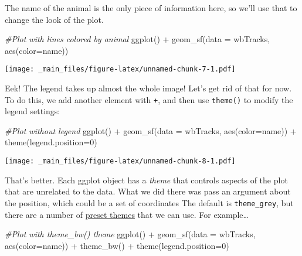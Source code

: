 \documentclass[
]{book}
\newenvironment{Shaded}{\begin{snugshade}}{\end{snugshade}}
\newcommand{\AttributeTok}[1]{\textcolor[rgb]{0.77,0.63,0.00}{#1}}
\newcommand{\CommentTok}[1]{\textcolor[rgb]{0.56,0.35,0.01}{\textit{#1}}}
\newcommand{\DecValTok}[1]{\textcolor[rgb]{0.00,0.00,0.81}{#1}}
\newcommand{\FunctionTok}[1]{\textcolor[rgb]{0.00,0.00,0.00}{#1}}
\newcommand{\NormalTok}[1]{#1}
\newcommand{\SpecialCharTok}[1]{\textcolor[rgb]{0.00,0.00,0.00}{#1}}
\begin{document}
The name of the animal is the only piece of information here, so we'll use that to change the look of the plot.

\begin{Shaded}
\begin{Highlighting}[]
\CommentTok{\#Plot with lines colored by animal}
\FunctionTok{ggplot}\NormalTok{() }\SpecialCharTok{+} 
  \FunctionTok{geom\_sf}\NormalTok{(}\AttributeTok{data =}\NormalTok{ wbTracks, }\FunctionTok{aes}\NormalTok{(}\AttributeTok{color=}\NormalTok{name))}
\end{Highlighting}
\end{Shaded}

\texttt{[image: \_main\_files/figure-latex/unnamed-chunk-7-1.pdf]}

Eek! The legend takes up almost the whole image! Let's get rid of that for now. To do this, we add another element with \texttt{+}, and then use \texttt{theme()} to modify the legend settings:

\begin{Shaded}
\begin{Highlighting}[]
\CommentTok{\#Plot without legend}
\FunctionTok{ggplot}\NormalTok{() }\SpecialCharTok{+} 
  \FunctionTok{geom\_sf}\NormalTok{(}\AttributeTok{data =}\NormalTok{ wbTracks, }\FunctionTok{aes}\NormalTok{(}\AttributeTok{color=}\NormalTok{name)) }\SpecialCharTok{+}
  \FunctionTok{theme}\NormalTok{(}\AttributeTok{legend.position=}\DecValTok{0}\NormalTok{)}
\end{Highlighting}
\end{Shaded}

\texttt{[image: \_main\_files/figure-latex/unnamed-chunk-8-1.pdf]}

That's better. Each ggplot object has a \emph{theme} that controls aspects of the plot that are unrelated to the data. What we did there was pass an argument about the position, which could be a set of coordinates The default is \texttt{theme\_grey}, but there are a number of \href{https://ggplot2.tidyverse.org/reference/ggtheme.html}{preset themes} that we can use. For example\ldots{}

\begin{Shaded}
\begin{Highlighting}[]
\CommentTok{\#Plot with theme\_bw() theme}
\FunctionTok{ggplot}\NormalTok{() }\SpecialCharTok{+} 
  \FunctionTok{geom\_sf}\NormalTok{(}\AttributeTok{data =}\NormalTok{ wbTracks, }\FunctionTok{aes}\NormalTok{(}\AttributeTok{color=}\NormalTok{name)) }\SpecialCharTok{+}
  \FunctionTok{theme\_bw}\NormalTok{() }\SpecialCharTok{+}
  \FunctionTok{theme}\NormalTok{(}\AttributeTok{legend.position=}\DecValTok{0}\NormalTok{)}
\end{Highlighting}
\end{Shaded}
\end{document}
